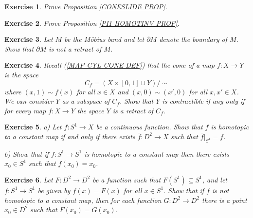 \documentclass[11pt, letterpaper, oneside]{report}
\theoremstyle{pplain}
\theoremstyle{ddefinition}
\theoremstyle{nnn}
\theoremstyle{eexercise}
\newtheorem{exercise}{Exercise}[chapter]
\begin{document}
\begin{exercise}
Prove Proposition \ref{CONESLIDE PROP}. 
\end{exercise}

 


\begin{exercise}
Prove Proposition \ref{PI1 HOMOTINV PROP}. 
\end{exercise}




\begin{exercise}
Let  $M$ be the M\"obius band and let $\partial M$ denote the boundary of $M$. 
Show that $\partial M$ is not a retract of $M$. 
\end{exercise}




\begin{exercise}
Recall (\ref{MAP CYL CONE DEF}) that the cone of a map $f\colon X \to Y$  is the space  
$$C_{f} =  (X\times [0, 1] \sqcup Y)/{\sim}$$
where $(x, 1) \sim f(x)$ for all $x\in X$ and $(x,0)\sim (x', 0)$ for all $x, x'\in X$. We 
can consider $Y$ as a subspace of $C_{f}$. Show that  $Y$ is contractible if any only 
if for every map $f\colon X \to Y$ the space $Y$ is a retract of $C_{f}$. 
\end{exercise}




\begin{exercise}
\label{S1 TO D2 EXT EXERCISE}
a) Let $f\colon S^{1} \to X$ be a continuous function. Show that $f$ is homotopic to a constant map 
if and only if there exists $\bar{f}\colon D^{2} \to X$ such that $\bar{f}|_{S^{1}} = f$. 

b) Show that if $f\colon S^{1} \to S^{1}$ is homotopic to a constant map then there exists $x_{0}\in S^{1}$
such that $f(x_{0}) = x_{0}$. 
\end{exercise}







\begin{exercise}
Let $F\colon D^{2} \to D^{2}$ be a function such that $F(S^{1}) \subseteq S^{1}$, and let  $f\colon S^{1}\to S^{1}$ 
be given by $f(x) = F(x)$  for all $x\in S^{1}$. Show that if $f$ is not homotopic to a constant map, then for each function $G\colon D^{2} \to D^{2}$ there is a point $x_{0}\in D^{2}$ such that $F(x_{0}) = G(x_{0})$.
\end{exercise}
\end{document}
